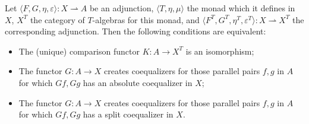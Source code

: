 Let $\langle F, G, \eta, \varepsilon \rangle: X \rightharpoonup A$ be an adjunction, $\langle T, \eta, \mu \rangle$ the monad which it defines in $X$, $X^T$ the category of $T$-algebras for this monad, and $\langle F^T, G^T, \eta^T, \varepsilon^T \rangle: X \rightharpoonup X^T$ the corresponding adjunction. Then the following conditions are equivalent:

\begin{itemize}
\item[(i)] The (unique) comparison functor $K: A \to X^T$ is an isomorphism;
\item[(ii)] The functor $G: A \to X$ creates coequalizers for those parallel pairs $f, g$ in $A$ for which $Gf, Gg$ has an absolute coequalizer in $X$;
\item[(iii)] The functor $G: A \to X$ creates coequalizers for those parallel pairs $f, g$ in $A$ for which $Gf, Gg$ has a split coequalizer in $X$.
\end{itemize}
